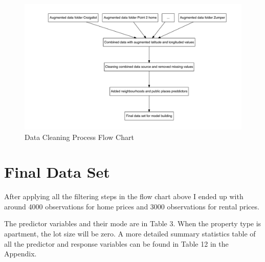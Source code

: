 \documentclass[
]{article}
\begin{document}
\begin{figure}
\centering
\includegraphics{final_report_files/figure-latex/unnamed-chunk-4-1.pdf}
\caption{Data Cleaning Process Flow Chart}
\end{figure}

\hypertarget{final-data-set}{%
\section{Final Data Set}\label{final-data-set}}

After applying all the filtering steps in the flow chart above I ended
up with around 4000 observations for home prices and 3000 observations
for rental prices.

The predictor variables and their mode are in Table 3. When the property
type is apartment, the lot size will be zero. A more detailed summary
statistics table of all the predictor and response variables can be
found in Table 12 in the Appendix.
\end{document}
